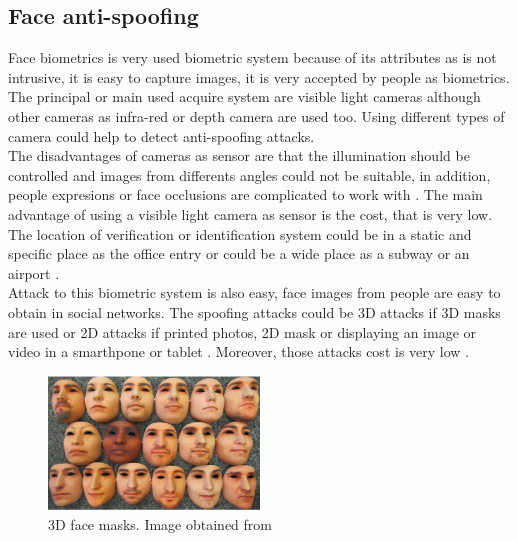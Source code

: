 \subsection{Face anti-spoofing}
Face biometrics is very used biometric system because of its attributes as is not intrusive, it is easy to capture images, it is very accepted by people as biometrics. \\

The principal or main used acquire system are visible light cameras although other cameras as infra-red  or depth camera are used too. Using different types of camera could help to detect anti-spoofing attacks.\\

The disadvantages of cameras as sensor are that the illumination should be controlled and images from differents angles could not be suitable, in addition, people expresions or face occlusions are complicated to work with \cite{survey2,2d_3d_face}. The main advantage of using a visible light camera as sensor is the cost, that is very low. \\

The location of verification or identification system could be in a static and specific place as the office entry or could be a wide place as a subway or an airport \cite{survey2}.\\

Attack to this biometric system is also easy, face images from people are easy to obtain in social networks. The spoofing attacks could be 3D attacks if 3D masks are used or 2D attacks if printed photos, 2D mask or displaying an image or video in a smarthpone or tablet \cite{2d_3d_face}. Moreover, those attacks cost is very low \cite{distorsion}.\\ 

\begin{figure}[htb]
\centering
\includegraphics[width=0.5\textwidth]{images_miscelaneus/fig_masks.png}
\caption{3D face masks. Image obtained from \cite{3dmask}} \label{fig:3dMasks}
\end{figure}

